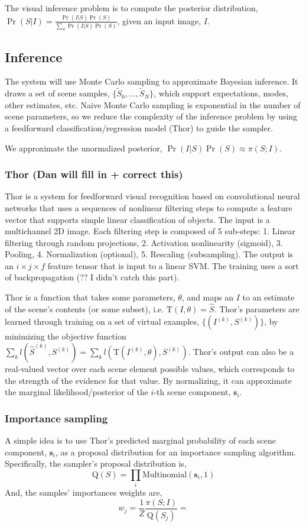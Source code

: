 \documentclass[]{report}
\begin{document}
The visual inference problem is to compute the posterior distribution,
$\Pr(S | I) = \frac{\Pr(I | S)\Pr(S)}{\sum_S \Pr(I | S)\Pr(S)}$, given
an input image, $I$.

\subsection*{Inference}
The system will use Monte Carlo sampling to approximate Bayesian
inference. It draws a set of scene samples,
$\{\tilde{S}_0,\dots,\tilde{S}_N\}$, which support expectations, modes,
other estimates, etc. Naive Monte Carlo sampling is exponential in the
number of scene parameters, so we reduce the complexity of the
inference problem by using a feedforward classification/regression
model (Thor) to guide the sampler.

We approximate the unormalized posterior, $\Pr(I | S)\Pr(S) \approx
\pi(S; I)$. 

\subsubsection*{Thor (Dan will fill in + correct this)}
Thor is a system for feedforward visual recognition based on
convolutional neural networks that uses a sequences of nonlinear
filtering steps to compute a feature vector that supports simple
linear classification of objects. The input is a multichannel 2D
image. Each filtering step is composed of 5 sub-steps: 1. Linear
filtering through random projections, 2. Activation nonlinearity
(sigmoid), 3. Pooling, 4. Normalization (optional), 5. Rescaling
(subsampling). The output is an $i\times j\times f$ feature tensor
that is input to a linear SVM. The training uses a sort of
backpropagation (?? I didn't catch this part).

Thor is a function that takes some parameters, $\theta$, and maps an
$I$ to an estimate of the scene's contents (or some subset),
i.e. $\mathrm{T}(I, \theta) = \hat{S}$. Thor's parameters are learned
through training on a set of virtual examples, $\{(I^{(k)},
S^{(k)})\}$, by minimizing the objective function $\sum_k
l(\hat{S}^{(k)}, S^{(k)}) = \sum_k l(\mathrm{T}(I^{(k)}, \theta),
S^{(k)})$. Thor's output can also be a real-valued vector over each
scene element possible values, which corresponds to the strength of
the evidence for that value. By normalizing, it can approximate the
marginal likelihood/posterior of the $i$-th scene component,
$\mathbf{s}_i$.

\subsubsection*{Importance sampling}
A simple idea is to use Thor's predicted marginal probability of each
scene component, $\mathbf{s}_i$, as a proposal distribution for an
importance sampling algorithm. Specifically, the sampler's proposal
distribution is,
\[
\mathrm{Q}(S) = \prod_i \mathrm{Multinomial}(\mathbf{s}_i, 1)
\]
And, the samples' importances weights are, 
\[
w_j = \frac{1}{Z} \frac{\pi(S; I)}{\mathrm{Q}(S_j)} =
\]
\end{document}
